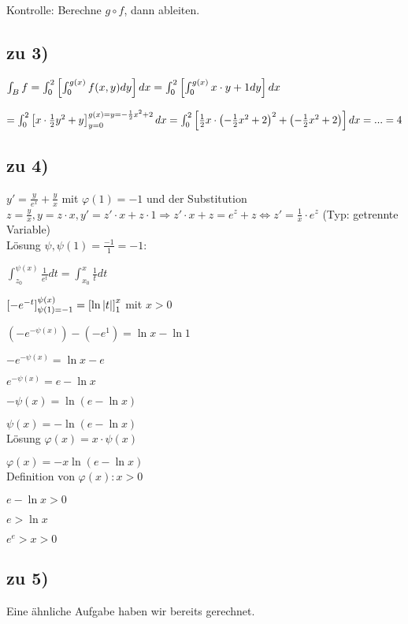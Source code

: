 Kontrolle: Berechne $ g\circ f$, dann ableiten. 

\subsection{zu 3)}
$
\int_{B} f
= \int_{0}^{2}  \left[  \int_{0}^{g(x)} f(x,y) dy \right]  dx 
= \int_{0}^{2}  \left[  \int_{0}^{g(x)} x\cdot y + 1 dy \right]  dx
$

$
= \int_{0}^{2}  \left[  x\cdot \frac{1}{2} y^2 + y \right] _{y=0}^{g(x)=y=-\frac{1}{2} x^2 + 2} dx  
= \int_{0}^{2}  \left[ \frac{1}{2} x \cdot  \left( -\frac{1}{2} x^2 + 2 \right) ^2 +  \left( -\frac{1}{2} x^2 + 2 \right)   \right]  dx
= ...
= 4
$

\subsection{zu 4)}
$ y' = \frac{y}{e^x} + \frac{y}{x} $ mit $\varphi(1) = -1$ und der Substitution 
$ z = \frac{y}{x},  y=z\cdot x, y' = z' \cdot x + z \cdot 1 \Rightarrow z' \cdot x + z = e^z + z \Leftrightarrow z' = \frac{1}{x} \cdot e^z$ (Typ: getrennte Variable)\\

Lösung $\psi, \psi(1) = \frac{-1}{1}=-1$:

$ \int_{z_0}^{\psi(x)} \frac{1}{e^t} dt = \int_{x_0}^{x} \frac{1}{t} dt$ 

$  \left[ - e^{-t} \right] _{\psi(1) = -1}^{\psi(x)} =  \left[ \ln  \left\vert t \right\vert  \right] _1^x $ mit $x>0$

$ (-e^{-\psi(x)}) - (-e^1) = \ln x - \ln 1 $ 

$ -e^{-\psi(x)} = \ln x - e $ 

$ e^{-\psi(x)} = e - \ln x $

$-\psi(x) = \ln (e- \ln x)$

$\psi(x) = - \ln (e- \ln x)$\\

Lösung $\varphi(x) = x\cdot \psi(x) $

$\varphi(x) = - x \ln(e - \ln x)$\\

Definition von $\varphi(x) : x > 0$

$e - \ln x > 0 $

$e > \ln x$

\underline{$ e^e > x > 0 $}

\subsection{zu 5)}
Eine ähnliche Aufgabe haben wir bereits gerechnet. 

